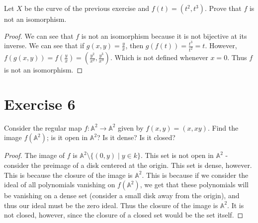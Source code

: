 \documentclass[12pt]{article}
\begin{document}
Let $X$ be the curve of the previous exercise and $f(t) = (t^2,t^3)$. Prove that $f$ is not an
isomorphism.

\begin{proof}

  We can see that $f$ is not an isomorphism because it is not bijective at its inverse. We can see
  that if $g(x,y) = \frac{y}{x}$, then $g(f(t)) = \frac{t^3}{t^2} = t$. However, 
  $f(g(x,y)) = f(\frac{y}{x}) = (\frac{y^2}{x^2},\frac{y^3}{x^3})$. Which is not defined whenever
  $x=0$. Thus $f$ is not an isomorphism.

\end{proof}


\section*{Exercise 6}

Consider the regular map $f: \mathbb{A}^2 \rightarrow \mathbb{A}^2$ given by $f(x,y) = (x,xy)$. Find
the image $f(\mathbb{A}^2)$; is it open in $\mathbb{A}^2$? Is it dense? Is it closed?


\begin{proof}

  The image of $f$ is $\mathbb{A}^2 \setminus \{(0,y) \mid y \in k\}$. This set is not open in
  $\mathbb{A}^2$ - consider the preimage of a disk centered at the origin. This set is dense,
  however. This is because the closure of the image is $\mathbb{A}^2$. This is because if we
  consider the ideal of all polynomials vanishing on $f(\mathbb{A}^2)$, we get that these
  polynomials will be vanishing on a dense set (consider a small disk away from the origin), 
  and thus our ideal must be the zero ideal. Thus the closure of the image is $\mathbb{A}^2$. It is
  not closed, however, since the closure of a closed set would be the set itself. 

\end{proof}
\end{document}

